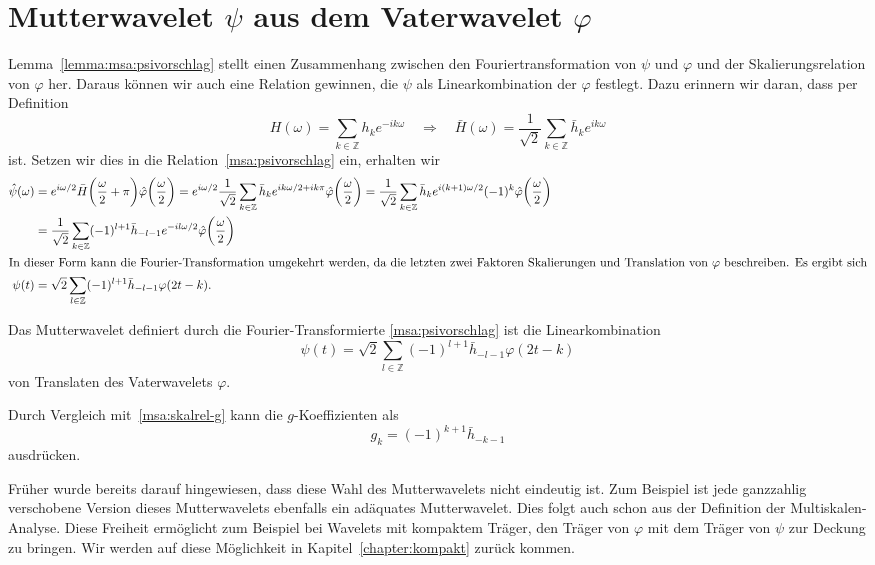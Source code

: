 %
%
%
\section{Mutterwavelet $\psi$ aus dem Vaterwavelet $\varphi$
\label{section:mutter-aus-vater}}
Lemma~\ref{lemma:msa:psivorschlag} stellt einen Zusammenhang zwischen
den Fouriertransformation von $\psi$ und $\varphi$ und der Skalierungsrelation
von $\varphi$ her.
Daraus können wir auch eine Relation gewinnen, die $\psi$ als
Linearkombination der $\varphi$ festlegt.
Dazu erinnern wir daran, dass per Definition
\[
H(\omega) = \sum_{k\in\mathbb Z} h_k e^{-ik\omega} 
\quad\Rightarrow\quad
\bar{H}(\omega)
=
\frac{1}{\sqrt{2}}
\sum_{k\in\mathbb Z} \bar{h}_k e^{ik\omega} 
\]
ist.
Setzen wir dies in die Relation~\eqref{msa:psivorschlag} ein, erhalten wir
\begin{align*}
\hat{\psi}(\omega)
&=
e^{i\omega/2}
\bar{H}\biggl(\frac{\omega}2+\pi\biggr)
\hat{\varphi}\biggl(\frac{\omega}2\biggr)
=
e^{i\omega/2}
\frac{1}{\sqrt{2}}
\sum_{k\in\mathbb Z} \bar{h}_k e^{ik\omega/2 + ik\pi} 
\hat{\varphi}\biggl(\frac{\omega}2\biggr)
=
\frac{1}{\sqrt{2}}
\sum_{k\in\mathbb Z} \bar{h}_k e^{i(k+1)\omega/2} (-1)^k
\hat{\varphi}\biggl(\frac{\omega}2\biggr)
\\
&=
\frac{1}{\sqrt{2}}
\sum_{k\in\mathbb Z}
(-1)^{l+1}
\bar{h}_{-l-1} e^{-il\omega/2}
\hat{\varphi}\biggl(\frac{\omega}2\biggr)
\\
\intertext{In dieser Form kann die Fourier-Transformation umgekehrt werden,
da die letzten zwei Faktoren Skalierungen und Translation von $\varphi$
beschreiben.
Es ergibt sich}
\psi(t)
&=
\sqrt{2}\sum_{l\in\mathbb Z} (-1)^{l+1}\bar{h}_{-l-1} \varphi(2t-k).
\end{align*}

\begin{lemma}
\label{lemma:msa:psirelation}
Das Mutterwavelet definiert durch die Fourier-Transformierte
\eqref{msa:psivorschlag}
ist die Linearkombination
\begin{equation}
\psi(t)
=
\sqrt{2}\sum_{l\in\mathbb Z} (-1)^{l+1}\bar{h}_{-l-1} \varphi(2t-k)
\end{equation}
von Translaten des Vaterwavelets $\varphi$.
\end{lemma}

Durch Vergleich mit~\eqref{msa:skalrel-g} kann die $g$-Koeffizienten als
\[
g_k = (-1)^{k+1} \bar{h}_{-k-1}
\]
ausdrücken.

Früher wurde bereits darauf hingewiesen, dass diese Wahl des Mutterwavelets
nicht eindeutig ist.
Zum Beispiel ist jede ganzzahlig verschobene Version dieses Mutterwavelets
ebenfalls ein adäquates Mutterwavelet.
Dies folgt auch schon aus der Definition der Multiskalen-Analyse.
Diese Freiheit ermöglicht zum Beispiel bei Wavelets mit kompaktem Träger,
den Träger von $\varphi$ mit dem Träger von $\psi$ zur Deckung zu
bringen.
Wir werden auf diese Möglichkeit in Kapitel~\ref{chapter:kompakt}
zurück kommen.


